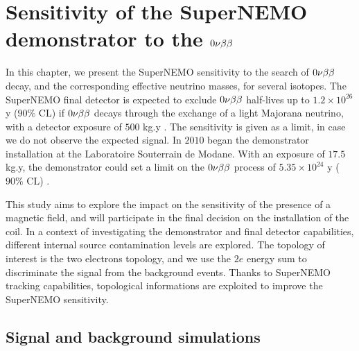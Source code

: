 \chapter{Sensitivity of the SuperNEMO demonstrator to the $0\nu\beta\beta$}
\label{ch:sensitivity}


In this chapter, we present the SuperNEMO sensitivity to the search of $0\nu\beta\beta$ decay, and the corresponding effective neutrino masses, for several isotopes.
The SuperNEMO final detector is expected to exclude $0\nu\beta\beta$ half-lives up to $1.2\times 10^{26}$ y ($90\%$ CL) if $0\nu\beta\beta$ decays through the exchange of a light Majorana neutrino, with a detector exposure of $500$ kg.y \cite{art:SuperNEMO2010}.
The sensitivity is given as a limit, in case we do not observe the expected signal.
In $2010$ began the demonstrator installation at the Laboratoire Souterrain de Modane.
With an exposure of $17.5$ kg.y, the demonstrator could set a limit on the $0\nu\beta\beta$ process of $5.35\times 10^{24}$ y ($90\%$ CL) \cite{CalvezThesis}.

This study aims to explore the impact on the sensitivity of the presence of a magnetic field, and will participate in the final decision on the installation of the coil.
In a context of investigating the demonstrator and final detector capabilities, different internal source contamination levels are explored.
The topology of interest is the two electrons topology, and we use the $2e$ energy sum to discriminate the signal from the background events.
Thanks to SuperNEMO tracking capabilities, topological informations are exploited to improve the SuperNEMO sensitivity.



\section{Signal and background simulations}
\label{sec:sensitivity_simus}

